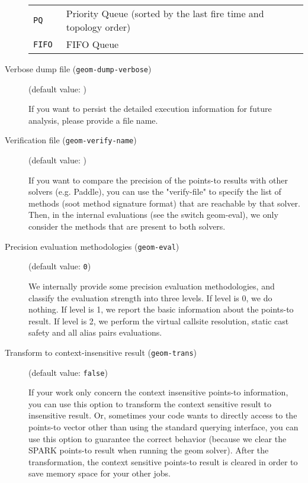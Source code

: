 \documentclass{article}
\begin{document}
\begin{description}
\begin{longtable}{p{1in}p{4in}}
{\tt PQ }
&

						      Priority Queue (sorted by the last fire time and topology order)
						    \\

{\tt FIFO }
&

						      FIFO Queue
						    \\

\end{longtable}


\item[Verbose dump file ({\tt geom-dump-verbose})]
(default value: {\tt })




						    If you want to persist the detailed execution information for future analysis, please provide a file name.
						  


\item[Verification file ({\tt geom-verify-name})]
(default value: {\tt })




						    If you want to compare the precision of the points-to results with other solvers (e.g. Paddle), you can use the "verify-file" to specify the list of methods (soot method signature format) that are reachable by that solver. Then, in the internal evaluations (see the switch geom-eval), we only consider the methods that are present to both solvers.
						  


\item[Precision evaluation methodologies ({\tt geom-eval})]
(default value: {\tt 0})




						    We internally provide some precision evaluation methodologies, and classify the evaluation strength into three levels. If level is 0, we do nothing. If level is 1, we report the basic information about the points-to result. If level is 2, we perform the virtual callsite resolution, static cast safety and all alias pairs evaluations.
						  


\item[Transform to context-insensitive result ({\tt geom-trans})]
(default value: {\tt false})




						    If your work only concern the context insensitive points-to information, you can use this option to transform the context sensitive result to insensitive result. Or, sometimes your code wants to directly access to the points-to vector other than using the standard querying interface, you can use this option to guarantee the correct behavior (because we clear the SPARK points-to result when running the geom solver). After the transformation, the context sensitive points-to result is cleared in order to save memory space for your other jobs.
						  



\end{description}
\end{document}
